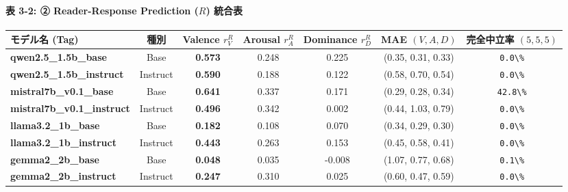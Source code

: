 \paragraph{表 3-2: ② Reader-Response Prediction ($R$) 統合表}
\begin{center}
\small
\begin{tabular}{lcccccc}
\toprule
\textbf{モデル名 (Tag)} & \textbf{種別} & \textbf{Valence $r_V^R$} & \textbf{Arousal $r_A^R$} & \textbf{Dominance $r_D^R$} & \textbf{MAE $(V, A, D)$} & \textbf{完全中立率 $(5,5,5)$} \\
\midrule
\textbf{qwen2.5\_1.5b\_base} & Base & \textbf{0.573} & 0.248 & 0.225 & (0.35, 0.31, 0.33) & \texttt{0.0\textbackslash{}\%} \\
\textbf{qwen2.5\_1.5b\_instruct} & Instruct & \textbf{0.590} & 0.188 & 0.122 & (0.58, 0.70, 0.54) & \texttt{0.0\textbackslash{}\%} \\
\textbf{mistral7b\_v0.1\_base} & Base & \textbf{0.641} & 0.337 & 0.171 & (0.29, 0.28, 0.34) & \texttt{42.8\textbackslash{}\%} \\
\textbf{mistral7b\_v0.1\_instruct} & Instruct & \textbf{0.496} & 0.342 & 0.002 & (0.44, 1.03, 0.79) & \texttt{0.0\textbackslash{}\%} \\
\textbf{llama3.2\_1b\_base} & Base & \textbf{0.182} & 0.108 & 0.070 & (0.34, 0.29, 0.30) & \texttt{0.0\textbackslash{}\%} \\
\textbf{llama3.2\_1b\_instruct} & Instruct & \textbf{0.443} & 0.263 & 0.153 & (0.45, 0.58, 0.41) & \texttt{0.0\textbackslash{}\%} \\
\textbf{gemma2\_2b\_base} & Base & \textbf{0.048} & 0.035 & -0.008 & (1.07, 0.77, 0.68) & \texttt{0.1\textbackslash{}\%} \\
\textbf{gemma2\_2b\_instruct} & Instruct & \textbf{0.247} & 0.310 & 0.025 & (0.60, 0.47, 0.59) & \texttt{0.0\textbackslash{}\%} \\
\bottomrule
\end{tabular}
\end{center}


